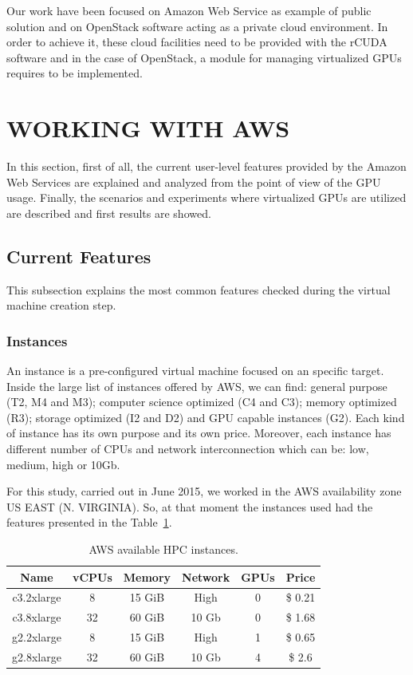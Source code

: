 \documentclass[a4paper,twoside]{article}
\begin{document}
Our work have been focused on Amazon Web Service as example of public 
solution and on OpenStack software acting as a private cloud environment. 
In order to achieve it, these cloud facilities need to be provided with the {rCUDA} software and 
in the case of OpenStack, a module for managing virtualized GPUs 
 requires to be implemented.  



\section{\uppercase{Working with AWS}}
\label{sec:workingaws}
In this section, first of all, the current user-level features 
provided by the Amazon Web Services are explained and analyzed 
from the point of view of the GPU usage. 
Finally, the scenarios and experiments where virtualized GPUs are utilized are 
described and first results are showed.

\subsection{Current Features}
This subsection explains the most common features checked during 
the virtual machine creation step.

\subsubsection{Instances}

An instance is a pre-configured virtual machine focused on an 
specific target. Inside the large list of instances offered by AWS, 
we can find: general purpose (T2, M4 and M3); computer science optimized 
(C4 and C3); memory optimized (R3); storage optimized (I2 and D2) and 
GPU capable instances (G2). Each kind of instance has its own purpose and its 
own price. Moreover, each instance has different number of CPUs and network 
interconnection which can be: low, medium, high or 10Gb.

For this study, carried out in June 2015, we worked in the AWS availability zone US EAST (N. VIRGINIA). 
So, at that moment the instances used had the features presented in the Table~\ref{table:awsInstances}. 

\begin{table}[htb]
\renewcommand{\arraystretch}{1.3}
\caption{AWS available HPC instances.}
\label{table:awsInstances}
\tabcolsep=0.09cm
\begin{center}\begin{tabular}{cccccc}
Name & vCPUs & Memory & Network & GPUs & Price\\ \hline \hline
c3.2xlarge & 8 & 15 GiB & High & 0 & \$ 0.21\\ \hline
c3.8xlarge & 32 & 60 GiB & 10 Gb & 0 & \$ 1.68 \\ \hline
g2.2xlarge & 8 & 15 GiB & High & 1 & \$ 0.65\\ \hline
g2.8xlarge & 32 & 60 GiB & 10 Gb & 4 & \$ 2.6 \\ \hline
\end{tabular}\end{center}\end{table}
\end{document}
